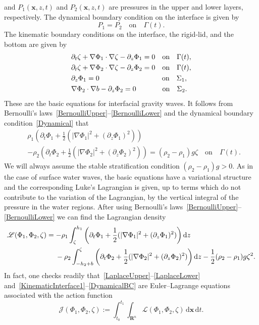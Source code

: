 \documentclass[11pt,leqno]{article}
\numberwithin{equation}{section}
\numberwithin{figure}{section}
\begin{document}
and $P_1(\bm{x},z,t)$ and $P_2(\bm{x},z,t)$ are pressures in the upper and lower layers, respectively. 
The dynamical boundary condition on the interface is given by 
%
\begin{equation}\label{Dynamical}
P_1 = P_2 \quad\mbox{on}\quad \Gamma(t).
\end{equation}
%
The kinematic boundary conditions on the interface, the rigid-lid, and the bottom are given by 
%
\begin{align}
&\label{KinematicInterface1}
 \partial_t\zeta + \nabla\Phi_1\cdot\nabla\zeta - \partial_z\Phi_1 = 0
 \quad\mbox{on}\quad \Gamma(t), \\
&\label{KinematicInterface2}
 \partial_t\zeta + \nabla\Phi_2\cdot\nabla\zeta - \partial_z\Phi_2 = 0
 \quad\mbox{on}\quad \Gamma(t), \\
&\label{KinematicLid}
 \partial_z\Phi_1 = 0 
 \makebox[18.3ex]{} \quad\mbox{on}\quad \Sigma_1, \\
&\label{KinematicBottom}
 \nabla\Phi_2\cdot\nabla b - \partial_z\Phi_2 = 0
 \makebox[6.3ex]{} \quad\mbox{on}\quad \Sigma_2.
\end{align}
%
These are the basic equations for interfacial gravity waves. 
It follows from Bernoulli's laws~\eqref{BernoulliUpper}--\eqref{BernoulliLower} and the dynamical 
boundary condition~\eqref{Dynamical} that 
%
\begin{align}\label{DynamicalBC}
& \rho_1\left( \partial_t\Phi_1 + \frac12(|\nabla\Phi_1|^2 + (\partial_z\Phi_1)^2) \right) \\
& - \rho_2\left( \partial_t\Phi_2 + \frac12(|\nabla\Phi_2|^2 + (\partial_z\Phi_2)^2) \right) 
 = (\rho_2-\rho_1)g\zeta
 \quad\mbox{on}\quad \Gamma(t). \nonumber
\end{align}
%
We will always assume the stable stratification condition $(\rho_2-\rho_1)g > 0$. 
As in the case of surface water waves, the basic equations have a variational structure and 
the corresponding Luke's Lagrangian is given, up to terms which do not contribute to the variation of the Lagrangian, 
by the vertical integral of the pressure in the water regions. 
After using Bernoulli's laws~\eqref{BernoulliUpper}--\eqref{BernoulliLower} we can find the Lagrangian density 
%
\begin{align}\label{Lagrangian}
\mathscr{L}(\Phi_1,\Phi_2,\zeta)
&= -\rho_1\int_{\zeta}^{h_1} \left( \partial_t\Phi_1 + \frac12(|\nabla\Phi_1|^2 + (\partial_z\Phi_1)^2) \right) {\rm d}z \\
&\quad\;
 - \rho_2\int_{-h_2+b}^{\zeta} \left( \partial_t\Phi_2 + \frac12(|\nabla\Phi_2|^2 + (\partial_z\Phi_2)^2) \right) {\rm d}z 
 - \frac12(\rho_2-\rho_1)g\zeta^2. \nonumber
\end{align}
%
In fact, one checks readily that~\eqref{LaplaceUpper}--\eqref{LaplaceLower} 
and~\eqref{KinematicInterface1}--\eqref{DynamicalBC} are Euler--Lagrange equations associated with the action function 
%
\[
\mathscr{J}(\Phi_1,\Phi_2,\zeta)
 := \int_{t_0}^{t_1}\!\!\!\int_{\mathbf{R}^n}\mathscr{L}(\Phi_1,\Phi_2,\zeta)\,\mathrm{d}\bm{x}\,\mathrm{d}t. 
\]
\end{document}
